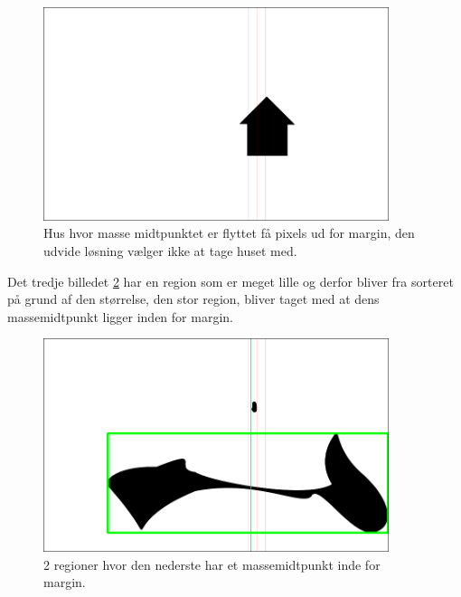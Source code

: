 \begin{figure}[h!!]
	\begin{center}
		\includegraphics[width=0.9\textwidth,angle=0]{afsnit/afprovning/billeder/udvidet_losning/udvidet_hus2_test.png}
	\end{center}
	\caption[]{Hus hvor masse midtpunktet er flyttet få pixels ud for margin, den udvide løsning vælger ikke at tage huset med.}
	\label{hus_virker_ikke}
\end{figure}

Det tredje billedet \ref{udvidet_blob_test} har en region som er meget lille
og derfor bliver fra sorteret på grund af den størrelse, den stor
region, bliver taget med at dens massemidtpunkt ligger inden for margin. 

\begin{figure}[h!!]
	\begin{center}
		\includegraphics[width=0.9\textwidth,angle=0]{afsnit/afprovning/billeder/udvidet_losning/udvidet_blob2_test.png}
	\end{center}
	\caption[]{2 regioner hvor den nederste har et massemidtpunkt inde for margin.}
	\label{udvidet_blob_test}
\end{figure}

